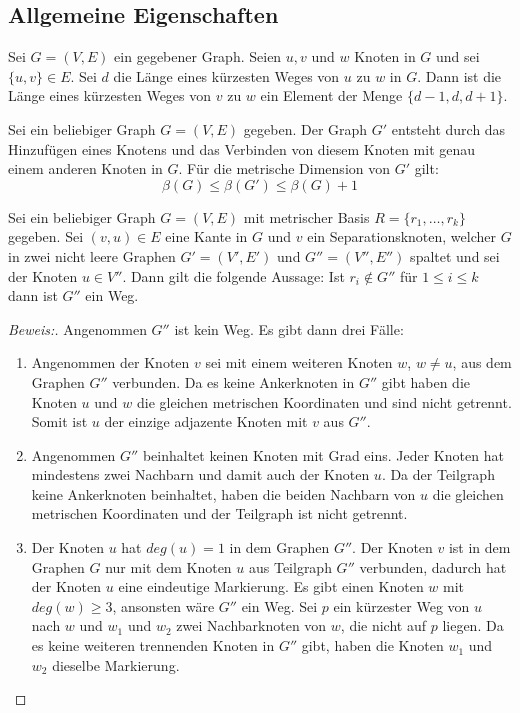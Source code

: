 \subsection{Allgemeine Eigenschaften}
\begin{lem}\cite{landmarks}
\label{dist}
Sei $G=(V,E)$ ein gegebener Graph. Seien $u,v$ und $w$ Knoten in $G$ und sei $\{u,v\}\in E$. Sei $d$ die Länge eines kürzesten Weges von $u$ zu $w$ in $G$. Dann ist die Länge eines kürzesten Weges von $v$ zu $w$ ein Element der Menge $\{d-1,d,d+1\}$.
\end{lem}
\begin{lem}
\cite{bases}
\label{einelementreichtnicht}
Sei ein beliebiger Graph $G=(V,E)$ gegeben. Der Graph $G'$ entsteht durch das Hinzufügen eines Knotens und das Verbinden von diesem Knoten mit genau einem anderen Knoten in $G$. Für die metrische Dimension von $G'$ gilt:
$$\beta(G)\leq \beta(G')\leq \beta(G)+1$$ 
\end{lem}
\begin{lem}
\label{wegtrennungsknoten}
\label{first_theorem}
Sei ein beliebiger Graph $G=(V,E)$ mit metrischer Basis $R=\{r_1, \ldots, r_k\}$ gegeben. Sei $(v,u) \in E$ eine Kante in $G$ und $v$ ein Separationsknoten, welcher $G$ in zwei nicht leere Graphen $G'=(V',E')$ und $G'' =(V'',E'' )$ spaltet und sei der Knoten $u \in V'' $. Dann gilt die folgende Aussage:\newline
Ist $r_i \notin G''$ für $1 \leq i \leq k$ dann ist $G'' $ ein Weg.
\end{lem}
\begin{proof}[Beweis:]
Angenommen $G'' $ ist kein Weg. Es gibt dann drei Fälle:
\begin{enumerate}
\item Angenommen der Knoten $v$ sei mit einem weiteren Knoten $w$, $w \neq u$, aus dem Graphen $G'' $ verbunden. Da es keine Ankerknoten in $G'' $ gibt haben die Knoten $u$ und $w$ die gleichen metrischen Koordinaten und sind nicht getrennt. Somit ist $u$ der einzige adjazente Knoten mit $v$ aus $G''$.
\item Angenommen $G''$ beinhaltet keinen Knoten mit Grad eins. Jeder Knoten hat mindestens zwei Nachbarn und damit auch der Knoten $u$. Da der Teilgraph keine Ankerknoten beinhaltet, haben die beiden Nachbarn von $u$ die gleichen metrischen Koordinaten und der Teilgraph ist nicht getrennt.
\item Der Knoten $u$ hat $deg(u)=1$ in dem Graphen $G''$. Der Knoten $v$ ist in dem Graphen $G$ nur mit dem Knoten $u$ aus Teilgraph $G''$ verbunden, dadurch hat der Knoten $u$ eine eindeutige Markierung. Es gibt einen Knoten $w$ mit $deg(w) \geq 3$, ansonsten wäre $G''$ ein Weg. Sei $p$ ein kürzester Weg von $u$ nach $w$ und $w_1$ und $w_2$ zwei Nachbarknoten von $w$, die nicht auf $p$ liegen. Da es keine weiteren trennenden Knoten in $G''$ gibt, haben die Knoten $w_1$ und $w_2$ dieselbe Markierung.   
\end{enumerate}
\vspace{-4mm}
\end{proof}
